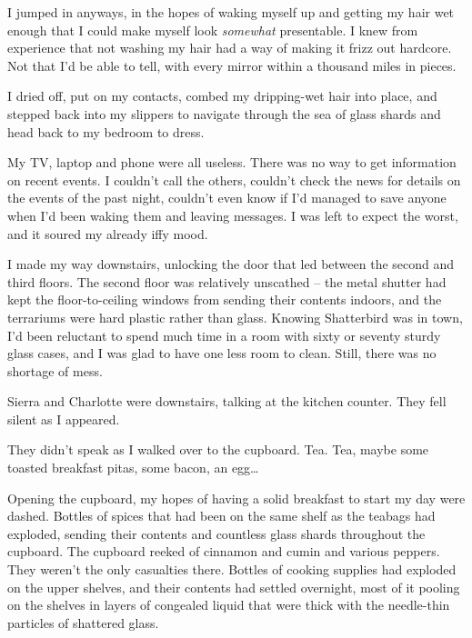 I jumped in anyways, in the hopes of waking myself up and getting my hair wet enough that I could make myself look \emph{somewhat} presentable.  I knew from experience that not washing my hair had a way of making it frizz out hardcore.  Not that I'd be able to tell, with every mirror within a thousand miles in pieces.



I dried off, put on my contacts, combed my dripping-wet hair into place, and stepped back into my slippers to navigate through the sea of glass shards and head back to my bedroom to dress.



My TV, laptop and phone were all useless.  There was no way to get information on recent events.  I couldn't call the others, couldn't check the news for details on the events of the past night, couldn't even know if I'd managed to save anyone when I'd been waking them and leaving messages.  I was left to expect the worst, and it soured my already iffy mood.



I made my way downstairs, unlocking the door that led between the second and third floors.  The second floor was relatively unscathed – the metal shutter had kept the floor-to-ceiling windows from sending their contents indoors, and the terrariums were hard plastic rather than glass.  Knowing Shatterbird was in town, I'd been reluctant to spend much time in a room with sixty or seventy sturdy glass cases, and I was glad to have one less room to clean.  Still, there was no shortage of mess.



Sierra and Charlotte were downstairs, talking at the kitchen counter.  They fell silent as I appeared.



They didn't speak as I walked over to the cupboard.  Tea.  Tea, maybe some toasted breakfast pitas, some bacon, an egg\ldots



Opening the cupboard, my hopes of having a solid breakfast to start my day were dashed. Bottles of spices that had been on the same shelf as the teabags had exploded, sending their contents and countless glass shards throughout the cupboard.  The cupboard reeked of cinnamon and cumin and various peppers.  They weren't the only casualties there.  Bottles of cooking supplies had exploded on the upper shelves, and their contents had settled overnight, most of it pooling on the shelves in layers of congealed liquid that were thick with the needle-thin particles of shattered glass.



